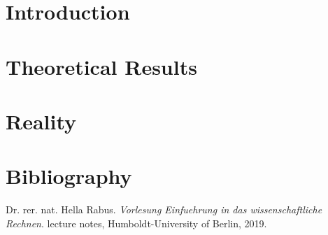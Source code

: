 \documentclass[refman]{scrartcl}
\theoremstyle{definition}
\begin{document}
%
%

\newpage
%
%
\section{Introduction}
%

\newpage
%
\section{Theoretical Results}
%


%
%

\section{Reality}
%
\section{Bibliography}
\begin{thebibliography}{9}
    Dr. rer. nat. Hella Rabus. 
    \textit{Vorlesung Einfuehrung in das wissenschaftliche Rechnen}. 
    lecture notes, Humboldt-University of Berlin, 2019.
\end{thebibliography}
\end{document}
